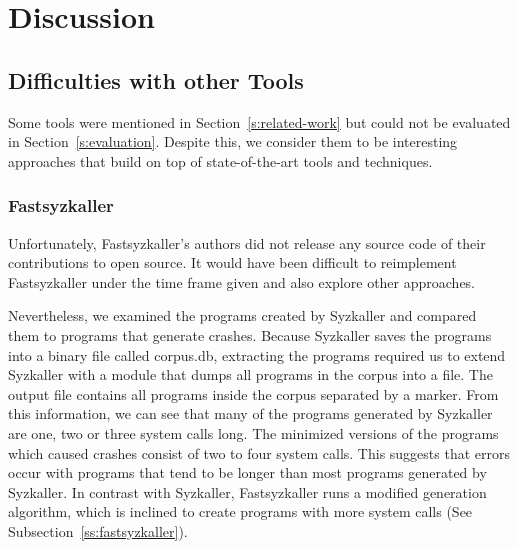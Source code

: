 \section{Discussion}


\subsection{Difficulties with other Tools}

Some tools were mentioned in Section~\ref{s:related-work} but could not be evaluated in Section~\ref{s:evaluation}.
Despite this, we consider them to be interesting approaches that build on top of state-of-the-art tools and techniques.

\subsubsection{Fastsyzkaller}

Unfortunately, Fastsyzkaller's authors did not release any source code of their contributions to open source.
It would have been difficult to reimplement Fastsyzkaller under the time frame given and also explore
other approaches.

Nevertheless, we examined the programs created by Syzkaller and compared them to programs that generate crashes.
Because Syzkaller saves the programs into a binary file called corpus.db,  extracting the programs required us
to extend Syzkaller with a module that dumps all programs in the corpus into a file. The output file contains
all programs inside the corpus separated by a marker.
From this information, we can see that many of the programs generated by Syzkaller are one, two or three system calls long.
The minimized versions of the programs which caused crashes consist of two to four system calls. This suggests
that errors occur with programs that tend to be longer than most programs generated by Syzkaller.
In contrast with Syzkaller, Fastsyzkaller runs a modified generation algorithm, which is inclined to create programs
with more system calls (See Subsection~\ref{ss:fastsyzkaller}).

